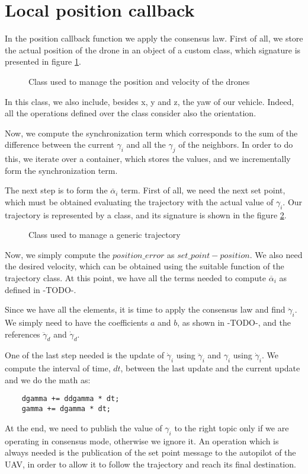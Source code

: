\section{Local position callback\label{sec:local_position_callback}}

In the position callback function we apply the consensus law. First of all, we
store the actual position of the drone in an object of a custom class,
which signature is presented in figure \ref{fig:drone_pose}.
\begin{figure}[ht]
\centering
  
\caption{Class used to manage the position and velocity of the drones}
\label{fig:drone_pose}
\end{figure}
In this class, we also include, besides x, y and z, the yaw of our vehicle. Indeed,
all the operations defined over the class consider also the orientation.

Now, we compute the synchronization term which corresponds to the sum of the
difference between the current $\gamma_i$ and all the $\gamma_j$ of the neighbors. %
In order to do this, we iterate over a container, which stores the values, and
we incrementally form the synchronization term.

The next step is to form the $\overline{\alpha}_i$ term. %
First of all, we need the next set point, which must be obtained evaluating
the trajectory with the actual value of $\gamma_i$.
Our trajectory is represented by a class, and its signature is shown in the figure
\ref{fig:trajectory}.
\begin{figure}[ht]
\centering
  
\caption{Class used to manage a generic trajectory}
\label{fig:trajectory}
\end{figure}
Now, we simply compute the $position\_error$ as $set\_point - position$.
We also need the desired velocity, which can be obtained using the suitable function
of the trajectory class.
At this point, we have all the terms needed to compute $\overline{\alpha}_i$
as defined in -TODO-. %

Since we have all the elements, it is time to apply the consensus law and find
$\ddot{\gamma}_i$. We simply need to have the coefficients $a$ and $b$, as shown in
-TODO-, and the references $\ddot{\gamma}_d$ and $\dot{\gamma}_d$.

One of the last step needed is the update of $\dot{\gamma}_i$ using $\ddot{\gamma}_i$
and $\gamma_i$ using $\dot{\gamma}_i$. We compute the interval of time, $dt$, between the
last update and the current update and we do the math as:
\begin{lstlisting}
    dgamma += ddgamma * dt;
    gamma += dgamma * dt;
\end{lstlisting}

At the end, we need to publish the value of $\gamma_i$ to the right topic only
if we are operating in consensus mode, otherwise we ignore it. An operation which is
always needed is the publication of the set point message to the autopilot of
the UAV, in order to allow it to follow the trajectory and reach its final destination.
